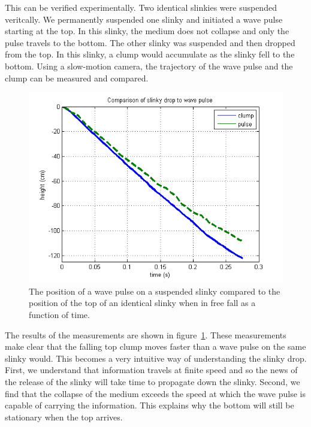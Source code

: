 \documentclass[prb,preprint,superscriptaddress]{revtex4-1}
\newcommand{\fig}[1]{figure~\ref{fig:#1}}
\begin{document}
This can be verified experimentally. Two identical slinkies were suspended veritcally.
We permanently suspended one slinky and initiated a wave pulse starting at the top.
In this slinky, the medium does not collapse and only the pulse travels to the bottom. The other slinky was suspended and then dropped from the top. In this
slinky, a clump would accumulate as the slinky fell to the bottom. Using a slow-motion camera, the trajectory of the wave pulse
and the clump can be measured and compared.

\begin{figure}[t!]
\begin{center}
\includegraphics[scale=0.5]{figs/ClumpPulse}
\end{center}
\vspace{-4ex}
\caption{The position of a wave pulse on a suspended slinky compared to the position
of the top of an identical slinky when in free fall as a function of time.}
\label{fig:clumppulse}
\end{figure}

The results of the measurements are shown in \fig{clumppulse}. These measurements
make clear that the falling top clump moves faster than a wave pulse on the same
slinky would. This becomes a very intuitive way of understanding the
slinky drop. First, we understand that information travels at finite speed and so
the news of the release of the slinky will take time to propagate down the slinky.
Second, we find that the collapse of the medium exceeds the speed at which
the wave pulse is capable of carrying the information. This explains why the
bottom will still be stationary when the top arrives.
\end{document}
